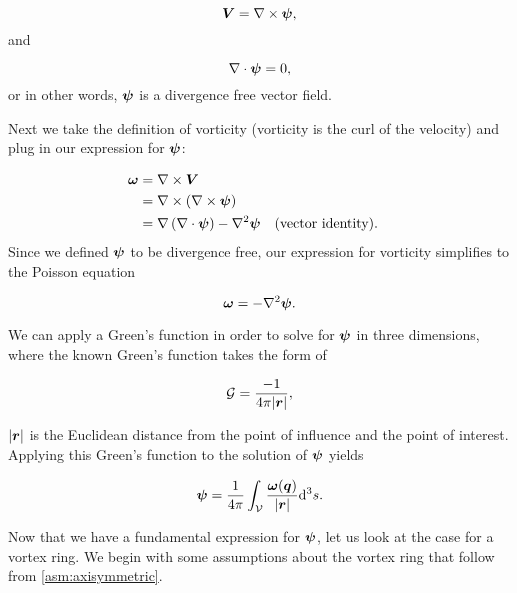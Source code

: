 \begin{equation}
    \bm{V} = \nabla \times \bm{\psi},
\end{equation}
%
and

\begin{equation}
    \nabla \cdot \bm{\psi} = 0,
\end{equation}
%
or in other words, \(\bm{\psi}\) is a divergence free vector field.

Next we take the definition of vorticity (vorticity is the curl of the velocity) and plug in our expression for \(\bm{\psi}\):

\begin{equation}
    \begin{aligned}
        \bm{\omega} &= \nabla \times \bm{V} \\
         &= \nabla \times \left( \nabla \times \bm{\psi} \right) \\
         &= \nabla \left(\nabla \cdot \bm{\psi} \right) - \nabla^2 \bm{\psi} && \text{(vector identity)}.
    \end{aligned}
\end{equation}
%
Since we defined \(\bm{\psi}\) to be divergence free, our expression for vorticity simplifies to the Poisson equation

\begin{equation}
    \bm{\omega} = - \nabla^2 \bm{\psi}.
\end{equation}

We can apply a Green's function in order to solve for \(\bm{\psi}\) in three dimensions, where the known Green's function takes the form of

\begin{equation}
    \mathcal{G} = \frac{-1}{4\pi |\bm{r}|},
\end{equation}

\where \(|\bm{r}|\) is the Euclidean distance from the point of influence and the point of interest.
%
Applying this Green's function to the solution of \(\bm{\psi}\) yields

\begin{equation}
    \label{eqn:psi1}
    \bm{\psi} = \frac{1}{4\pi} \int_{\mathcal{V}} \frac{\bm{\omega}(\bm{q})}{|\bm{r}|} \mathrm{d}^3s.
\end{equation}


Now that we have a fundamental expression for \(\bm{\psi}\), let us look at the case for a vortex ring.
%
We begin with some assumptions about the vortex ring that follow from \cref{asm:axisymmetric}.

